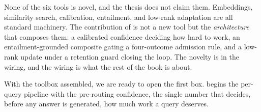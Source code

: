 \begin{defence}
None of the six tools is novel, and the thesis does not claim them. Embeddings,
similarity search, calibration, entailment, and low-rank adaptation are all standard
machinery. The contribution of \caem{} is not a new tool but the \emph{architecture}
that composes them: a calibrated confidence deciding how hard to work, an
entailment-grounded composite gating a four-outcome admission rule, and a low-rank
update under a retention guard closing the loop. The novelty is in the wiring, and
the wiring is what the rest of the book is about.
\end{defence}

With the toolbox assembled, we are ready to open the first box. 
begins the per-query pipeline with the pre-routing confidence, the single number
that decides, before any answer is generated, how much work a query deserves.

